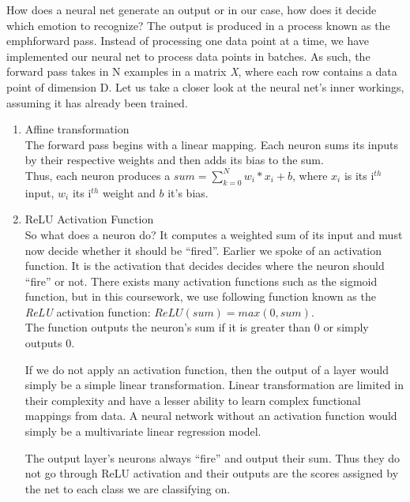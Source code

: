 How does a neural net generate an output or in our case, how does it decide which emotion to recognize?
The output is produced in a process known as the emph{forward pass}.
Instead of processing one data point at a time,
we have implemented our neural net to process data points in batches.
As such, the forward pass takes in N examples in a matrix \emph{X}, where each row contains a data point of dimension D.
Let us take a closer look at the neural net's inner workings, assuming it has already been trained.

\begin{enumerate}
   \item Affine transformation\\
     The forward pass begins with a linear mapping.
     Each neuron sums its inputs by their respective weights and then adds its bias to the sum.\\
     Thus, each neuron produces a $sum = \sum_{k=0}^{N} w_i * x_i + b$,
     where $x_i$ is its i$^{th}$ input, $w_i$ its i$^{th}$ weight and $b$ it's bias.
     
   \item ReLU Activation Function\\
     So what does a neuron do? It computes a weighted sum of its input and must now decide whether it should be ``fired''.
     Earlier we spoke of an activation function.
     It is the activation that decides decides where the neuron should ``fire'' or not. 
     There exists many activation functions such as the sigmoid function,
     but in this coursework, we use following function known as the \emph{ReLU} activation function:
     $ReLU(sum) = max(0,sum)$.\\
     The function outputs the neuron's sum if it is greater than 0 or simply outputs 0.

     If we do not apply an activation function, then the output of a layer would simply be a simple linear transformation.
     Linear transformation are limited in their complexity and have a lesser ability to learn complex functional mappings from data.
     A neural network without an activation function would simply be a multivariate linear regression model.

     The output layer's neurons always ``fire'' and output their sum.
     Thus they do not go through ReLU activation and
     their outputs are the scores assigned by the net to each class we are classifying on.

     


\end{enumerate}
